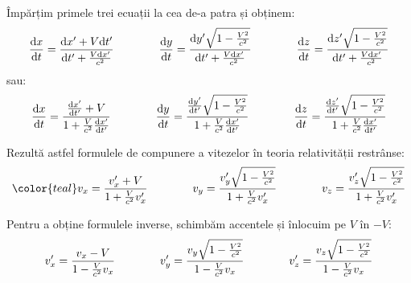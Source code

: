 Împărțim primele trei ecuații la cea de-a patra și obținem:
\begin{equation*}
    \begin{aligned}[t]
        \dv{x}{t} = \frac{\dd x' + V\dd t'}{\dd t' + \frac{V\dd x'}{c^2}}
    \end{aligned}\qquad\qquad
    \begin{aligned}[t]
        \dv{y}{t} = \frac{\dd y'\sqrt{1 - \frac{V^2}{c^2}}}{\dd t' + \frac{V\dd x'}{c^2}}
    \end{aligned}\qquad\qquad
    \begin{aligned}[t]
        \dv{z}{t} = \frac{\dd z'\sqrt{1 - \frac{V^2}{c^2}}}{\dd t' + \frac{V\dd x'}{c^2}}
    \end{aligned}
\end{equation*}
sau:
\begin{equation*}
    \begin{aligned}[t]
        \dv{x}{t} = \frac{\dv{x'}{t'} + V}{1 + \frac{V}{c^2}\dv{x'}{t'}}
    \end{aligned}\qquad\qquad
    \begin{aligned}[t]
        \dv{y}{t} = \frac{\dv{y'}{t'}\sqrt{1 - \frac{V^2}{c^2}}}{1 + \frac{V}{c^2}\dv{x'}{t'}}
    \end{aligned}\qquad\qquad
    \begin{aligned}[t]
        \dv{z}{t} = \frac{\dv{z'}{t'}\sqrt{1 - \frac{V^2}{c^2}}}{1 + \frac{V}{c^2}\dv{x'}{t'}}
    \end{aligned}
\end{equation*}

Rezultă astfel formulele de compunere a vitezelor în teoria relativității
restrânse:
\begin{equation*}
    \color{\accentcolor}
    \begin{aligned}[t]
        v_x = \frac{v_x' + V}{1 + \frac{V}{c^2}v_x'}
    \end{aligned}\qquad\qquad
    \begin{aligned}[t]
        v_y = \frac{v_y'\lorentzradical}{1 + \frac{V}{c^2}v_x'}
    \end{aligned}\qquad\qquad
    \begin{aligned}[t]
        v_z = \frac{v_z'\lorentzradical}{1 + \frac{V}{c^2}v_x'}
    \end{aligned}
\end{equation*}

Pentru a obține formulele inverse, schimbăm accentele și înlocuim pe $V$ în
$-V$:
\begin{equation*}
    \begin{aligned}[t]
        v_x' = \frac{v_x - V}{1 - \frac{V}{c^2}v_x}
    \end{aligned}\qquad\qquad
    \begin{aligned}[t]
        v_y' = \frac{v_y\sqrt{1 - \frac{V^2}{c^2}}}{1 - \frac{V}{c^2}v_x}
    \end{aligned}\qquad\qquad
    \begin{aligned}[t]
        v_z' = \frac{v_z\sqrt{1 - \frac{V^2}{c^2}}}{1 - \frac{V}{c^2}v_x}
    \end{aligned}
\end{equation*}

